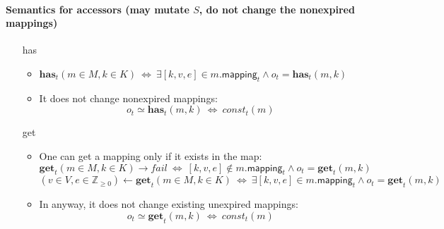 \documentclass{article}
\renewcommand{\o}[1]{\ensuremath{\mathbf{#1}}}
\newcommand{\p}[1]{\ensuremath{\mathit{#1}}}
\newcommand{\s}[1]{\ensuremath{\mathsf{#1}}}
\newcommand{\nintset}{\ensuremath{\mathds{Z}_{\ge 0}}}
\begin{document}
\paragraph{Semantics for accessors (may mutate $S$, do not change the nonexpired mappings)}
\begin{itemize}
   \item[has]
     \begin{itemize}
       \item $\o{has}_t(m \in M, k \in K) ~\Leftrightarrow~ \exists [k,v,e] \in m.\s{mapping}_t \wedge o_t=\o{has}_t(m, k)$\\
       \item It does not change nonexpired mappings:
         \begin{equation}
           o_t \simeq \o{has}_t(m, k) ~\Leftrightarrow~ \p{const}_t(m)
         \end{equation}
     \end{itemize}
     \item[get]
       \begin{itemize}
         \item One can get a mapping only if it exists in the map:
           $$\o{get}_t(m \in M, k \in K) \rightarrow fail ~\Leftrightarrow~ [k,v,e] \not\in m.\s{mapping}_t \wedge o_t=\o{get}_t(m, k)$$
           $$(v\in V,e\in \nintset)\gets \o{get}_t(m \in M, k \in K) ~\Leftrightarrow~ \exists [k,v,e] \in m.\s{mapping}_t \wedge o_t=\o{get}_t(m, k)$$
         \item In anyway, it does not change existing unexpired mappings:
           $$o_t \simeq \o{get}_t(m, k) ~\Leftrightarrow~ \p{const}_t(m)$$
       \end{itemize}
\end{itemize}
\end{document}
